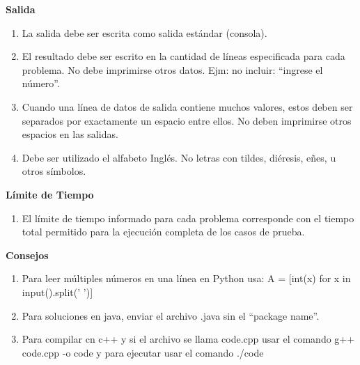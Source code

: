 \documentclass[11pt,a4paper,oneside]{article}
\begin{document}
\textbf{Salida}
\begin{enumerate}
    \item La salida debe ser escrita como salida estándar (consola).
    \item El resultado debe ser escrito en la cantidad de líneas especificada para cada problema. No debe imprimirse otros datos. Ejm: no incluir: ``ingrese el número''.
    \item Cuando una línea de datos de salida contiene muchos valores, estos deben ser separados por exactamente un espacio entre ellos. No deben imprimirse otros espacios en las salidas.
    \item Debe ser utilizado el alfabeto Inglés. No letras con tildes, diéresis, eñes, u otros símbolos.
\end{enumerate}

\textbf{Límite de Tiempo}
\begin{enumerate}
    \item El límite de tiempo informado para cada problema corresponde con el tiempo total permitido para la ejecución completa de los casos de prueba.
\end{enumerate}

\textbf{Consejos}
\begin{enumerate}
    \item Para leer múltiples números en una línea en Python usa: A = [int(x) for x in input().split(' ')]
    \item Para soluciones en java, enviar el archivo .java sin el ``package name''.
    \item Para compilar cn c++ y si el archivo se llama code.cpp usar el comando g++ code.cpp -o code y para ejecutar usar el comando ./code
\end{enumerate}
\end{document}
